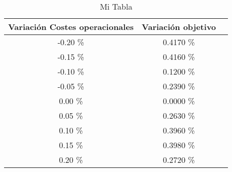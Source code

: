 \begin{table}
\centering
\begin{tabular}{|c|c|c|}
\hline
 Variación Costes operacionales & Variación objetivo \\ \hline
-0.20 \% & 0.4170 \% \\ \hline
-0.15 \% & 0.4160 \% \\ \hline
-0.10 \% & 0.1200 \% \\ \hline
-0.05 \% & 0.2390 \% \\ \hline
0.00 \% & 0.0000 \% \\ \hline
0.05 \% & 0.2630 \% \\ \hline
0.10 \% & 0.3960 \% \\ \hline
0.15 \% & 0.3980 \% \\ \hline
0.20 \% & 0.2720 \% \\ \hline
\end{tabular}
\caption{Mi Tabla}
\end{table}

